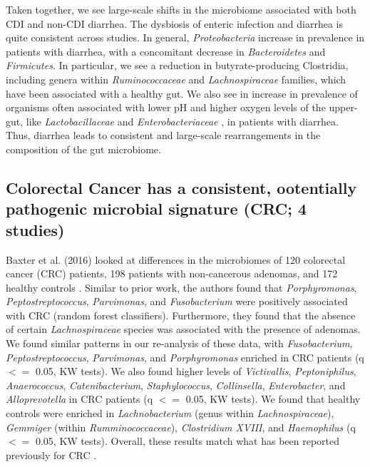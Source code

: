 \documentclass{article}
\begin{document}
{Taken together, we see large-scale shifts in the microbiome associated with both CDI and non-CDI diarrhea. 
The dysbiosis of enteric infection and diarrhea is quite consistent across studies. 
In general, \textit{Proteobacteria} increase in prevalence in patients with diarrhea, with a concomitant decrease in \textit{Bacteroidetes} and \textit{Firmicutes}. 
In particular, we see a reduction in butyrate-producing Clostridia, including genera within \textit{Ruminococcaceae} and \textit{Lachnospiraceae} families, which have been associated with a healthy gut. 
We also see in increase in prevalence of organisms often associated with lower pH and higher oxygen levels of the upper-gut, like \textit{Lactobacillaceae} and \textit{Enterobacteriaceae} \cite{donaldson2016gut}, in patients with diarrhea. 
Thus, diarrhea leads to consistent and large-scale rearrangements in the composition of the gut microbiome.

\subsection*{Colorectal Cancer has a consistent, ootentially pathogenic microbial signature (CRC; 4 studies)}

Baxter et al. (2016) looked at differences in the microbiomes of 120 colorectal cancer (CRC) patients, 198 patients with non-cancerous adenomas, and 172 healthy controls \cite{crc-baxter}. 
Similar to prior work, the authors found that \textit{Porphyromonas}, \textit{Peptostreptococcus}, \textit{Parvimonas}, and \textit{Fusobacterium} were positively associated with CRC (random forest classifiers). 
Furthermore, they found that the absence of certain \textit{Lachnospiraceae} species was associated with the presence of adenomas. 
We found similar patterns in our re-analysis of these data, with \textit{Fusobacterium}, \textit{Peptostreptococcus}, \textit{Parvimonas}, and \textit{Porphyromonas} enriched in CRC patients (q $<=$ 0.05, KW tests). 
We also found higher levels of \textit{Victivallis}, \textit{Peptoniphilus}, \textit{Anaerococcus}, \textit{Catenibacterium}, \textit{Staphylococcus}, \textit{Collinsella}, \textit{Enterobacter}, and \textit{Alloprevotella} in CRC patients (q $<=$ 0.05, KW tests). 
We found that healthy controls were enriched in \textit{Lachnobacterium} (genus within \textit{Lachnospiraceae}), \textit{Gemmiger} (within \textit{Rumminococcaceae}), \textit{Clostridium XVIII}, and \textit{Haemophilus} (q $<=$ 0.05, KW tests). 
Overall, these results match what has been reported previously for CRC \cite{brennan2016gut}.

}
\end{document}

